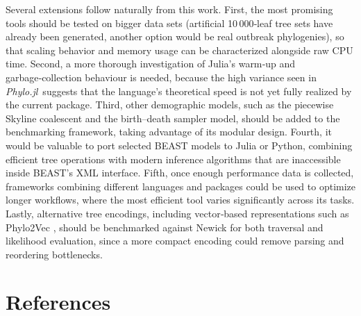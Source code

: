 \documentclass[11pt, a4paper]{article}
\newcommand{\phylo}{\textit{Phylo.jl}}
\begin{document}
Several extensions follow naturally from this work.  First, the most promising tools should be tested on bigger data sets (artificial 10\,000‑leaf tree sets have already been generated, another option would be real outbreak phylogenies), so that scaling behavior and memory usage can be characterized alongside raw CPU time.  Second, a more thorough investigation of Julia's warm‑up and garbage‑collection behaviour is needed, because the high variance seen in \phylo\ suggests that the language's theoretical speed is not yet fully realized by the current package.  Third, other demographic models, such as
the piecewise Skyline coalescent and the birth--death sampler model, should be added to the benchmarking framework, taking advantage of its modular design.  Fourth, it would be valuable to port selected BEAST models to Julia or Python, combining efficient tree operations with modern inference algorithms that are inaccessible inside BEAST's XML interface.  Fifth, once enough performance data is collected, frameworks combining different languages and packages could be used to optimize longer workflows, where the most efficient tool varies significantly across its tasks. Lastly, alternative tree encodings, including vector‑based representations such as Phylo2Vec \cite{penn2025phylo2vec}, should be benchmarked against Newick for both traversal and likelihood evaluation, since a more compact encoding could remove parsing and reordering bottlenecks.

\pagebreak

\section{References}
\end{document}
